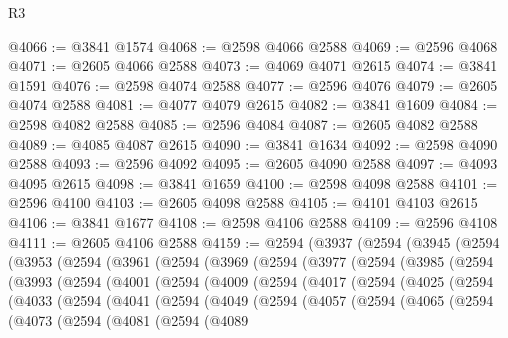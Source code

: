 \begin{lexlean}{R3}
\begin{coremodule}
@4066 := @3841 @1574
@4068 := @2598 @4066 @2588
@4069 := @2596 @4068
@4071 := @2605 @4066 @2588
@4073 := @4069 @4071 @2615
@4074 := @3841 @1591
@4076 := @2598 @4074 @2588
@4077 := @2596 @4076
@4079 := @2605 @4074 @2588
@4081 := @4077 @4079 @2615
@4082 := @3841 @1609
@4084 := @2598 @4082 @2588
@4085 := @2596 @4084
@4087 := @2605 @4082 @2588
@4089 := @4085 @4087 @2615
@4090 := @3841 @1634
@4092 := @2598 @4090 @2588
@4093 := @2596 @4092
@4095 := @2605 @4090 @2588
@4097 := @4093 @4095 @2615
@4098 := @3841 @1659
@4100 := @2598 @4098 @2588
@4101 := @2596 @4100
@4103 := @2605 @4098 @2588
@4105 := @4101 @4103 @2615
@4106 := @3841 @1677
@4108 := @2598 @4106 @2588
@4109 := @2596 @4108
@4111 := @2605 @4106 @2588
@4159 := @2594
    (@3937
      (@2594
        (@3945
          (@2594
            (@3953
              (@2594
                (@3961
                  (@2594
                    (@3969
                      (@2594
                        (@3977
                          (@2594
                            (@3985
                              (@2594
                                (@3993
                                  (@2594
                                    (@4001
                                      (@2594
                                        (@4009
                                          (@2594
                                            (@4017
                                              (@2594
                                                (@4025
                                                  (@2594
                                                    (@4033
                                                      (@2594
                                                        (@4041
                                                          (@2594
                                                            (@4049
                                                              (@2594
                                                                (@4057
                                                                  (@2594
                                                                    (@4065
                                                                      (@2594
                                                                        (@4073
                                                                          (@2594
                                                                            (@4081
                                                                              (@2594
                                                                                (@4089

\end{coremodule}
\end{lexlean}
